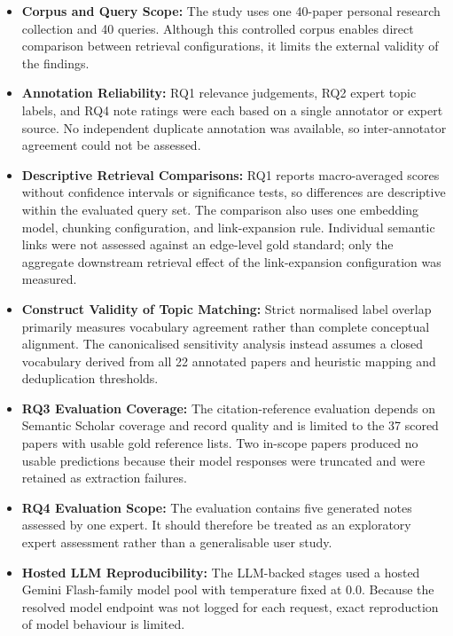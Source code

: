 \documentclass[runningheads]{llncs}
\begin{document}
\begin{itemize}
    \item \textbf{Corpus and Query Scope:}
    The study uses one 40-paper personal research collection and
    40 queries. Although this controlled corpus enables direct comparison
    between retrieval configurations, it limits the external validity of
    the findings.

    \item \textbf{Annotation Reliability:}
    RQ1 relevance judgements, RQ2 expert topic labels, and RQ4 note
    ratings were each based on a single annotator or expert source. No
    independent duplicate annotation was available, so inter-annotator
    agreement could not be assessed.

    \item \textbf{Descriptive Retrieval Comparisons:}
    RQ1 reports macro-averaged scores without confidence intervals or
    significance tests, so differences are descriptive within the
    evaluated query set. The comparison also uses one embedding model,
    chunking configuration, and link-expansion rule. Individual semantic
    links were not assessed against an edge-level gold standard; only
    the aggregate downstream retrieval effect of the link-expansion
    configuration was measured.

    \item \textbf{Construct Validity of Topic Matching:}
    Strict normalised label overlap primarily measures vocabulary
    agreement rather than complete conceptual alignment. The
    canonicalised sensitivity analysis instead assumes a closed
    vocabulary derived from all 22 annotated papers and heuristic
    mapping and deduplication thresholds.

    \item \textbf{RQ3 Evaluation Coverage:}
    The citation-reference evaluation depends on Semantic Scholar coverage
    and record quality and is limited to the 37 scored papers with usable
    gold reference lists. Two in-scope papers produced no usable predictions
    because their model responses were truncated and were retained as
    extraction failures.

    \item \textbf{RQ4 Evaluation Scope:}
    The evaluation contains five generated notes assessed by one expert.
    It should therefore be treated as an exploratory expert assessment
    rather than a generalisable user study.

    \item \textbf{Hosted LLM Reproducibility:}
    The LLM-backed stages used a hosted Gemini Flash-family model pool
    with temperature fixed at \(0.0\). Because the resolved model
    endpoint was not logged for each request, exact reproduction of
    model behaviour is limited.
\end{itemize}
\end{document}
